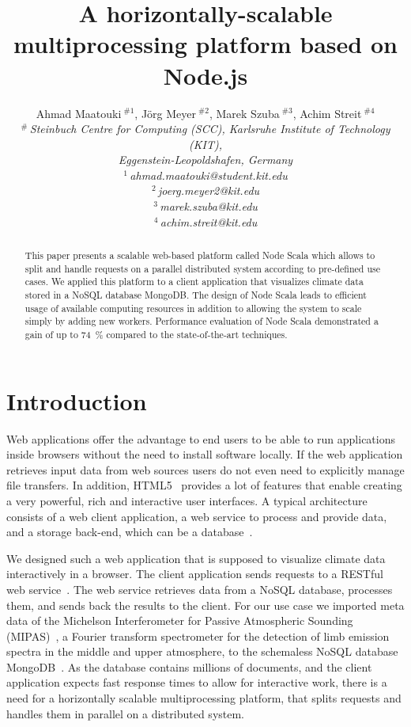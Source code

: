 \documentclass[10pt,conference,letterpaper]{IEEEtran}
\title{A horizontally-scalable multiprocessing platform based on Node.js}
\author{{Ahmad Maatouki{\small $~^{\#1}$}, J\"org Meyer{\small $~^{\#2}$}, Marek Szuba{\small $~^{\#3}$}, Achim Streit{\small $~^{\#4}$} }\vspace{1.6mm}\\
\fontsize{10}{10}\selectfont\itshape
$^{\#}$\,Steinbuch Centre for Computing (SCC), Karlsruhe Institute of Technology (KIT),\\
Eggenstein-Leopoldshafen, Germany\\
\fontsize{9}{9}\selectfont\ttfamily\upshape
$^{1}$\,ahmad.maatouki@student.kit.edu\\
$^{2}$\,joerg.meyer2@kit.edu\\
$^{3}$\,marek.szuba@kit.edu\\
$^{4}$\,achim.streit@kit.edu\vspace{1.2mm}\\
\fontsize{10}{10}\selectfont\rmfamily\itshape
\fontsize{9}{9}\selectfont\ttfamily\upshape
}
\begin{document}
\maketitle
\begin{abstract}
  This paper presents a scalable web-based platform called Node Scala which
  allows to split and handle requests on a parallel distributed system
  according to pre-defined use cases. We applied this platform to a
  client application that visualizes climate data stored in a NoSQL
  database MongoDB. The design of Node Scala leads to efficient usage
  of available computing resources in addition to allowing the system
  to scale simply by adding new workers. Performance evaluation of
  Node Scala demonstrated a gain of up to 74~\% compared to the
  state-of-the-art techniques.

\end{abstract}



\section{Introduction}
Web applications offer the advantage to end users to be able to run applications inside browsers without the need to install software locally. If the web application retrieves input data from web sources users do not even need to explicitly manage file transfers. In addition, HTML5~\cite{html5} provides a lot of features that enable creating a very powerful, rich and interactive user interfaces. A typical architecture consists of a web client application, a web service to process and provide data, and a storage back-end, which can be a database~\cite{yue2004underlying}.

We designed such a web application that is supposed to visualize climate data interactively in a browser. The client application sends requests to a RESTful web service~\cite{Fielding:2002:PDM:514183.514185}. The web service retrieves data from a NoSQL database, processes them, and sends back the results to the client. For our use case we imported meta data of the Michelson Interferometer for Passive Atmospheric Sounding (MIPAS)~\cite{mipas}, a Fourier transform spectrometer for the detection of limb emission spectra in the middle and upper atmosphere, to the schemaless NoSQL database MongoDB~\cite{Ameri14,mongodb}. As the database contains millions of documents, and the client application expects fast response times to allow for interactive work, there is a need for a horizontally scalable multiprocessing platform, that splits requests and handles them in parallel on a distributed system.
\end{document}
